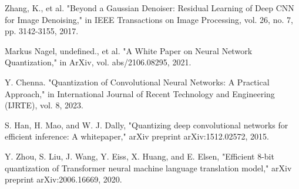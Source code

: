 \documentclass[lettersize,journal]{IEEEtran}
\begin{document}
\begin{thebibliography}{00}
	Zhang, K., et al. "Beyond a Gaussian Denoiser: Residual Learning of Deep CNN for Image Denoising," in IEEE Transactions on Image Processing, vol. 26, no. 7, pp. 3142-3155, 2017.
	
	Markus Nagel, undefined., et al. "A White Paper on Neural Network Quantization," in ArXiv, vol. abs/2106.08295, 2021.
	
	Y. Chenna. "Quantization of Convolutional Neural Networks: A Practical Approach," in International Journal of Recent Technology and Engineering (ĲRTE), vol. 8, 2023.
	
	S. Han, H. Mao, and W. J. Dally, "Quantizing deep convolutional networks for efficient inference: A whitepaper," arXiv preprint arXiv:1512.02572, 2015.
	
	Y. Zhou, S. Liu, J. Wang, Y. Eiss, X. Huang, and E. Elsen, "Efficient 8-bit quantization of Transformer neural machine language translation model," arXiv preprint arXiv:2006.16669, 2020.


	
\end{thebibliography}
\end{document}
